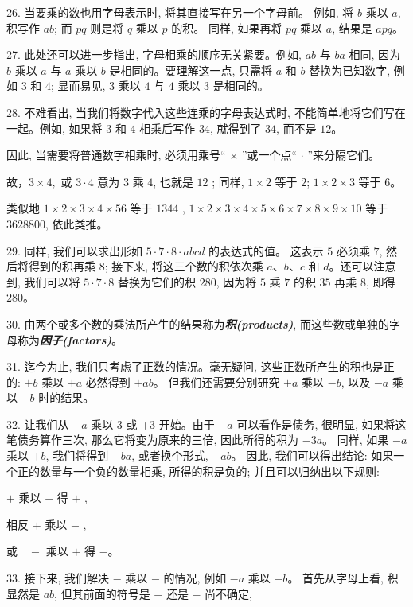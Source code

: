 26. 当要乘的数也用字母表示时, 将其直接写在另一个字母前。
例如, 将 $b$ 乘以 $a$, 积写作 $ab$; 
而 $pq$ 则是将 $q$ 乘以 $p$ 的积。
同样, 如果再将 $pq$ 乘以 $a$, 结果是 $apq$。
\par
27. 此处还可以进一步指出, 
字母相乘的顺序无关紧要。例如, $ab$ 与 $ba$ 相同, 
因为 $b$ 乘以 $a$ 与 $a$ 乘以 $b$ 是相同的。要理解这一点, 
只需将 $a$ 和 $b$ 替换为已知数字, 例如 $3$ 和 $4$; 
显而易见, $3$ 乘以 $4$ 与 $4$ 乘以 $3$ 是相同的。
\par
28. 不难看出, 当我们将数字代入这些连乘的字母表达式时, 
不能简单地将它们写在一起。例如, 如果将 $3$ 和 $4$ 相乘后写作 $34$, 
就得到了 $34$, 而不是 $12$。\par
因此, 当需要将普通数字相乘时, 
必须用乘号“ $\times$ ”或一个点“ $\cdot$ ”来分隔它们。\par
故，$3 \times 4,$ 或 $3 \cdot 4$ 意为 $3$ 乘 $4$, 也就是 $12$ ; 
同样, $1 \times 2$ 等于 $2$; $1 \times 2 \times 3$ 等于 $6$。\par
类似地 $1 \times 2 \times 3 \times 4 \times 56$ 等于 $1344$ , $1 \times 2 \times 3 \times 4 \times 5 \times 6 \times 7 \times 8 \times 9 \times 10$ 等于 $3628800$, 依此类推。
\par
29. 同样, 我们可以求出形如 $5 \cdot 7 \cdot 8 \cdot abcd$ 的表达式的值。
这表示 $5$ 必须乘 $7$, 然后将得到的积再乘 $8$; 
接下来, 将这三个数的积依次乘 $a$、$b$、$c$ 和 $d$。还可以注意到, 我们可以将 $5 \cdot 7 \cdot 8$ 替换为它们的积 $280$, 因为将 $5$ 乘 $7$ 的积 $35$ 再乘 $8$, 即得 $280$。
\par
30. 由两个或多个数的乘法所产生的结果称为\textbf{\textit{积(products)}}, 而这些数或单独的字母称为\textbf{\textit{因子(factors)}}。
\par
31. 迄今为止, 我们只考虑了正数的情况。毫无疑问, 这些正数所产生的积也是正的: $+b$ 乘以 $+a$ 必然得到 $+ab$。
但我们还需要分别研究 $+a$ 乘以 $-b$, 以及 $-a$ 乘以 $-b$ 时的结果。
\par
32. 让我们从 $-a$ 乘以 3 或 +3 开始。由于 $-a$ 可以看作是债务, 很明显, 如果将这笔债务算作三次, 
那么它将变为原来的三倍, 因此所得的积为 $-3a$。
同样, 如果 $-a$ 乘以 $+b$, 我们将得到 $-ba$, 或者换个形式, $-ab$。
因此, 我们可以得出结论: 如果一个正的数量与一个负的数量相乘, 所得的积是负的; 并且可以归纳出以下规则: \par
$+$ 乘以 $+$ 得 $+$ , \par
相反 $+$ 乘以 $-$ , \par
或 $\ \ \ -$ 乘以 $+$ 得 $-$。
\par
33. 接下来, 我们解决 $-$ 乘以 $-$ 的情况, 例如 $-a$ 乘以 $-b$。
首先从字母上看, 积显然是 $ab$, 但其前面的符号是 $+$ 还是 $-$ 尚不确定, 
